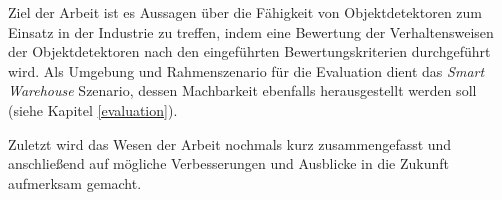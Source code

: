 Ziel der Arbeit ist es Aussagen über die Fähigkeit von Objektdetektoren zum Einsatz in der Industrie zu treffen, indem eine Bewertung der Verhaltensweisen der Objektdetektoren nach den eingeführten Bewertungskriterien durchgeführt wird. Als Umgebung und Rahmenszenario für die Evaluation dient das \textit{Smart Warehouse} Szenario, dessen Machbarkeit ebenfalls herausgestellt werden soll (siehe Kapitel \ref{evaluation}).

Zuletzt wird das Wesen der Arbeit nochmals kurz zusammengefasst und anschließend auf mögliche Verbesserungen und Ausblicke in die Zukunft aufmerksam gemacht. 
